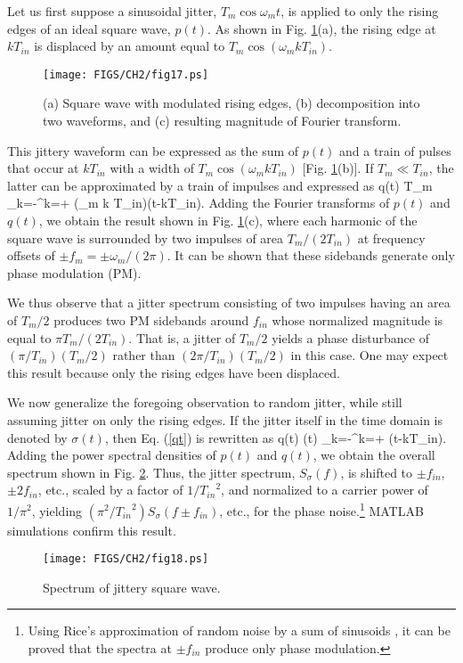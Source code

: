 Let us first suppose a sinusoidal jitter, $T_m \cos \omega_m t$, is applied to only the rising edges of an ideal square wave, $p(t)$. As shown in Fig.
\ref{fig:squaretonepn}(a), the rising edge at $k T_{in}$ is displaced by an amount equal to $T_m \cos (\omega_m k T_{in})$.
\begin{figure}[htb!]
\centering
\texttt{[image: FIGS/CH2/fig17.ps]}
\caption{(a) Square wave with modulated rising edges, (b) decomposition into two waveforms, and (c) resulting magnitude of Fourier transform.}
\label{fig:squaretonepn}
\end{figure}
This jittery waveform can be expressed as the sum of $p(t)$ and a train of pulses that occur at $k T_{in}$ with a width of $T_m \cos (\omega_m k T_{in})$
[Fig. \ref{fig:squaretonepn}(b)]. If $T_m \ll T_{in}$, the latter can be approximated by a train of impulses and expressed as
\beq
q(t) \approx T_m  \sum_{k=-\infty}^{k=+\infty} \cos (\omega_m k T_{in})\;\delta (t-k{T_{in}}).
\label{qt}
\eeq
Adding the Fourier transforms of $p(t)$ and $q(t)$, we obtain the result shown in Fig. \ref{fig:squaretonepn}(c), where each harmonic of the square wave is
surrounded by two impulses of area $T_m / (2T_{in})$ at frequency offsets of $\pm f_m= \pm \omega _m / (2 \pi)$. It can be shown that these sidebands
generate only phase modulation (PM).

We thus observe that a jitter spectrum consisting of two impulses having an area of $T_m/2$ produces two PM sidebands around $f_{in}$ whose normalized
magnitude is equal to $\pi T_m / (2 T_{in})$. That is, a jitter of $T_m/2$ yields a phase disturbance of $(\pi /T_{in})(T_m /2)$ rather than $(2 \pi
/T_{in})(T_m /2)$ in this case. One may expect this result because only the rising edges have been displaced.

We now generalize the foregoing observation to random jitter, while still assuming jitter on only the rising edges. If the jitter itself in the time
domain is denoted by $\sigma (t)$, then Eq. (\ref{qt}) is rewritten as 
\beq
q(t) \approx  \sigma (t) \sum_{k=-\infty}^{k=+\infty} \delta (t-k{T_{in}}).
\label{qtrandom}
\eeq
Adding the power spectral densities of $p(t)$ and $q(t)$, we obtain the overall spectrum shown in Fig. \ref{fig:psdrising}. Thus, the jitter spectrum,
$S_\sigma(f)$, is shifted to $\pm f_{in}$, $\pm 2f_{in}$, etc., scaled by a factor of $1/{T_{in}}^2$, and normalized to a carrier power of $1/\pi
^2$, yielding $(\pi^2/{T_{in}}^2)S_\sigma(f \pm f_{in})$, etc., for the phase noise.\footnote{Using Rice's approximation of random noise by a sum of
sinusoids \cite{Rice}, it can be proved that the spectra at $\pm f_{in}$ produce only phase modulation.} MATLAB simulations confirm this result.
\begin{figure}[htb!]
\centering
\texttt{[image: FIGS/CH2/fig18.ps]}
\caption{Spectrum of jittery square wave.}
\label{fig:psdrising}
\end{figure}

